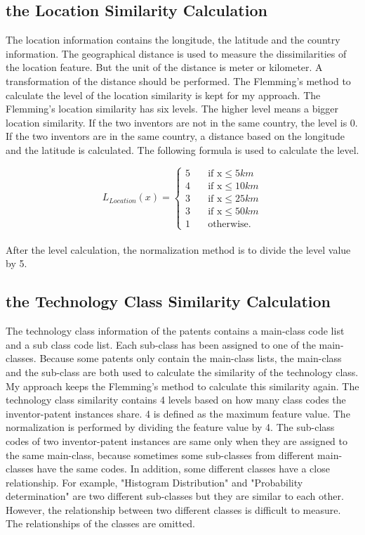 \subsection{the Location Similarity Calculation}
The location information contains the longitude, the latitude and the country information. The geographical distance is used to measure the dissimilarities of the location feature. But the unit of the distance is meter or kilometer. A transformation of the distance should be performed. The Flemming's method \cite{RePEc:eee:respol:v:43:y:2014:i:6:p:941-955} to calculate the level of the location similarity is kept for my approach. The Flemming's location similarity has six levels. The higher level means a bigger location similarity. If the two inventors are not in the same country, the level is 0. If the two inventors are in the same country, a distance based on the longitude and the latitude is calculated. The following formula is used to calculate the level.

\[   
L_{Location}(x) = 
     \begin{cases}
       \text{5} &\quad\text{if x}\le5km\\
       \text{4} &\quad\text{if x}\le10km \\
       \text{3} &\quad\text{if x}\le25km\\
       \text{3} &\quad\text{if x}\le50km\\
       \text{1} &\quad\text{otherwise.} \ 
     \end{cases}
\]
\\

After the level calculation, the normalization method is to divide the level value by 5.

\subsection{the Technology Class Similarity Calculation}
The technology class information of the patents contains a main-class code list and a sub class code list. Each sub-class has been assigned to one of the main-classes. Because some patents only contain the main-class lists, the main-class and the sub-class are both used to calculate the similarity of the technology class. My approach keeps the Flemming's method to calculate this similarity again. The technology class similarity contains 4 levels based on how many class codes the inventor-patent instances share. 4 is defined as the maximum feature value. The normalization is performed by dividing the feature value by 4. The sub-class codes of two inventor-patent instances are same only when they are assigned to the same main-class, because sometimes some sub-classes from different main-classes have the same codes. In addition, some different classes have a close relationship. For example, "Histogram Distribution" and "Probability determination" are two different sub-classes but they are similar to each other. However, the relationship between two different classes is difficult to measure. The relationships of the classes are omitted.


